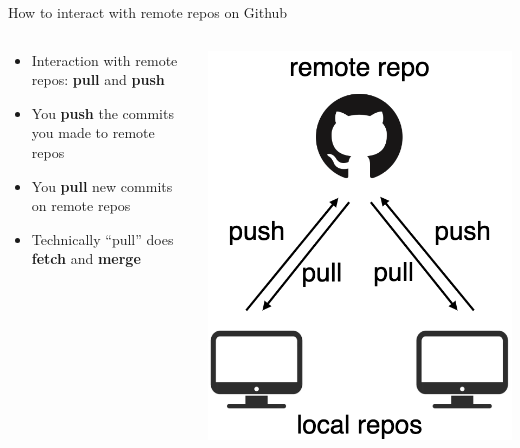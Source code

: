 \documentclass[handout,pdftex,10pt,aspectratio=169]{beamer}
\begin{document}
\begin{frame}{How to interact with remote repos on Github}
  \begin{columns}[c]
    \begin{column}{0.6\linewidth}
      \begin{itemize}\setlength\itemsep{10pt}
        \item<1-> Interaction with remote repos: \textbf{pull} and \textbf{push}
        \item<2-> You \textbf{push} the commits you made to remote repos
        \item<3-> You \textbf{pull} new commits on remote repos
        \item<3-> Technically ``pull'' does \textbf{fetch} and \textbf{merge}
      \end{itemize}
    \end{column} \hfill
    \begin{column}{0.39\linewidth}
      \includegraphics[width = 0.9\linewidth]{github_pullpush.png}
    \end{column}
  \end{columns}
\end{frame}
\end{document}
